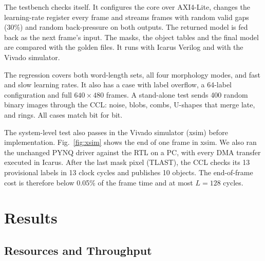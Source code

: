 \documentclass[conference]{IEEEtran}
\begin{document}
The testbench checks itself. It configures the core over AXI4-Lite, changes the
learning-rate register every frame and streams frames with random valid gaps
(30\%) and random back-pressure on both outputs. The returned model is fed back
as the next frame's input. The masks, the object tables and the final model are
compared with the golden files. It runs with Icarus Verilog and with the Vivado
simulator.

The regression covers both word-length sets, all four morphology modes, and fast
and slow learning rates. It also has a case with label overflow, a 64-label
configuration and full $640\times480$ frames. A stand-alone test sends 400
random binary images through the CCL: noise, blobs, combs, U-shapes that merge
late, and rings. All cases match bit for bit.

The system-level test also passes in the Vivado simulator (xsim) before
implementation. Fig.~\ref{fig:xsim} shows the end of one frame in xsim. We also
ran the unchanged PYNQ driver against the RTL on a PC, with every DMA transfer
executed in Icarus. After the last mask pixel (TLAST), the CCL checks its 13
provisional labels in 13 clock cycles and publishes 10 objects. The end-of-frame
cost is therefore below 0.05\% of the frame time and at most $L=128$ cycles.

\section{Results}
\subsection{Resources and Throughput}
\end{document}
